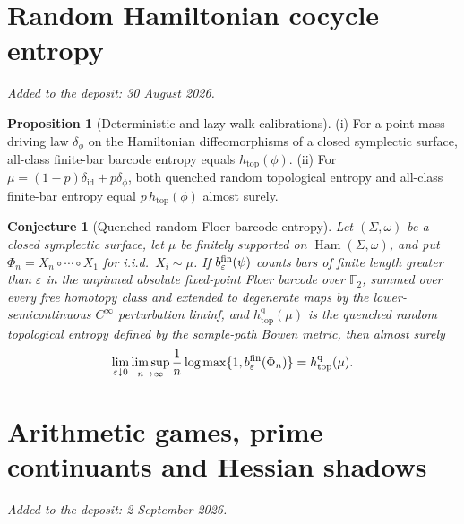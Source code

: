 \documentclass[11pt]{article}
\newtheorem{conjecture}{Conjecture}
\theoremstyle{definition}
\newtheorem{proposition}{Proposition}
\begin{document}
\part{Random Hamiltonian cocycle entropy}

\medskip\noindent\emph{Added to the deposit: 30 August 2026.}\par\medskip

\begin{proposition}[Deterministic and lazy-walk calibrations]\label{ar:basic}
{\rm(i)} For a point-mass driving law $\delta_\phi$ on the Hamiltonian
diffeomorphisms of a closed symplectic surface, all-class finite-bar barcode
entropy equals $h_{\mathrm{top}}(\phi)$.  {\rm(ii)} For
$\mu=(1-p)\delta_{\mathrm{id}}+p\delta_\phi$, both quenched random topological
entropy and all-class finite-bar entropy equal
$p\,h_{\mathrm{top}}(\phi)$ almost surely.
\end{proposition}

\begin{conjecture}[Quenched random Floer barcode entropy]\label{ar1}
Let $(\Sigma,\omega)$ be a closed symplectic surface, let $\mu$ be finitely
supported on $\operatorname{Ham}(\Sigma,\omega)$, and put
$\Phi_n=X_n\circ\cdots\circ X_1$ for i.i.d.\ $X_i\sim\mu$.  If
$b_\varepsilon^{\rm fin}(\psi)$ counts bars of finite length greater than
$\varepsilon$ in the unpinned absolute fixed-point Floer barcode over
$\mathbb F_2$, summed over every free homotopy class and extended to
degenerate maps by the lower-semicontinuous $C^\infty$ perturbation liminf,
and $h_{\mathrm{top}}^{\mathrm q}(\mu)$ is the quenched random topological
entropy defined by the sample-path Bowen metric, then almost surely
\[
 \lim_{\varepsilon\downarrow0}\limsup_{n\to\infty}
 \frac1n\log\max\{1,b_\varepsilon^{\rm fin}(\Phi_n)\}
 =h_{\mathrm{top}}^{\mathrm q}(\mu).
\]
\end{conjecture}




\part{Arithmetic games, prime continuants and Hessian shadows}

\medskip\noindent\emph{Added to the deposit: 2 September 2026.}\par\medskip
\end{document}
